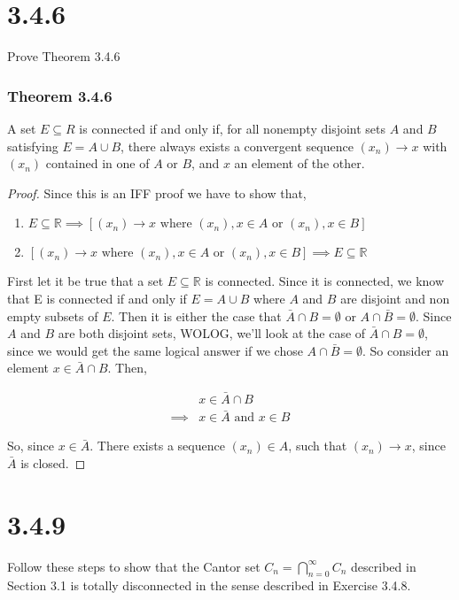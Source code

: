 \documentclass{article}
\begin{document}
\section*{3.4.6}
Prove Theorem 3.4.6
\subsubsection*{\textbf{Theorem 3.4.6}}
A set $E \subseteq R$ is connected if and only if, for all nonempty
disjoint sets $A$ and $B$ satisfying $E = A \cup B$, there always exists a convergent sequence $(x_n) \rightarrow x$ with $(x_n)$ contained in one of $A$ or $B$, and $x$ an element of the other.

\begin{proof}
Since this is an IFF proof we have to show that,
\begin{enumerate}
\item $E \subseteq \mathbb{R} \implies [(x_n) \rightarrow x  \text{ where } (x_n),x \in A \text{ or } (x_n),x \in B]$
\item $[(x_n) \rightarrow x \text{ where } (x_n),x \in A \text{ or } (x_n),x \in B] \implies  E \subseteq \mathbb{R}$
\end{enumerate}


First let it be true that a set $E \subseteq \mathbb{R}$ is connected. Since it is connected, we know that E is connected if and only if $E = A \cup B$ where $A$ and $B$ are disjoint and non empty subsets of $E$. Then it is either the case that $\bar{A} \cap B = \emptyset$ or $A \cap \bar{B} = \emptyset$. Since $A$ and $B$ are both disjoint sets, WOLOG, we'll look at the case of $\bar{A} \cap B = \emptyset$, since we would get the same logical answer if we chose $A \cap \bar{B} = \emptyset$. So consider an element $x \in \bar{A} \cap B$. Then,

\begin{equation} \label{eq1}
\begin{split}
 & x \in  \bar{A} \cap B\\
\implies & x \in \bar{A}  \text{ and }  x \in B
\end{split}
\end{equation}

So, since $x \in \bar{A}$. There exists a sequence $(x_n) \in A$, such that $(x_n) \rightarrow x$, since $\bar{A}$ is closed.


\end{proof}


\section*{3.4.9}
Follow these steps to show that the Cantor set $ C_n = \bigcap\limits^\infty_{n=0} C_n$ described in Section 3.1 is totally disconnected in the sense described in Exercise 3.4.8.
\end{document}
